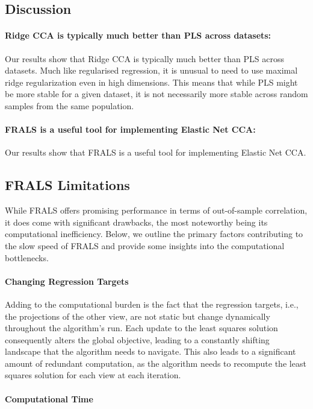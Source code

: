 \subsection{Discussion}

\paragraph{Ridge CCA is typically much better than PLS across datasets:} Our results show that Ridge CCA is typically much better than PLS across datasets.
Much like regularised regression, it is unusual to need to use maximal ridge regularization even in high dimensions.
This means that while PLS might be more stable for a given dataset, it is not necessarily more stable across random samples from the same population.

\paragraph{FRALS is a useful tool for implementing Elastic Net CCA:} Our results show that FRALS is a useful tool for implementing Elastic Net CCA.

\subsection{FRALS Limitations}
While FRALS offers promising performance in terms of out-of-sample correlation, it does come with significant drawbacks, the most noteworthy being its computational inefficiency.
Below, we outline the primary factors contributing to the slow speed of FRALS and provide some insights into the computational bottlenecks.

\paragraph{Changing Regression Targets}\label{subsec:changing-regression-targets}
Adding to the computational burden is the fact that the regression targets, i.e., the projections of the other view, are not static but change dynamically throughout the algorithm's run.
Each update to the least squares solution consequently alters the global objective, leading to a constantly shifting landscape that the algorithm needs to navigate.
This also leads to a significant amount of redundant computation, as the algorithm needs to recompute the least squares solution for each view at each iteration.

\paragraph{Computational Time}\label{subsec:computational-time}

